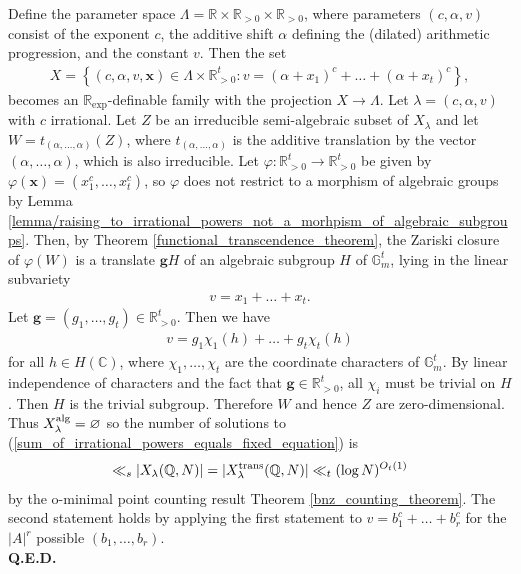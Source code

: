 \documentclass[9pt]{amsart}
\theoremstyle{my_theorem_style}
\numberwithin{definition}{section}
\renewenvironment{proof}{\noindent {\textbf{Proof.}}}{\\\textbf{Q.E.D.}}
\newcommand{\C}{\mathbb{C}}
\newcommand{\G}{\mathbb{G}}
\renewcommand{\phi}{\varphi}
\newcommand{\Q}{\mathbb{Q}}
\newcommand{\R}{\mathbb{R}}
\renewcommand{\vec}[1]{\bm{#1}}
\begin{document}
\begin{proof}
    Define the parameter space $\Lambda = \R \times \R_{>0} \times \R_{>0}$, where parameters $(c, \alpha, v)$ consist of the exponent $c$, the additive shift $\alpha$ defining the (dilated) arithmetic progression, and the constant $v$. Then the set
    \begin{align*}
        X = 
        \left\{
        (c, \alpha, v, \vec{x}) \in
        \Lambda \times \R_{>0}^t :
        v = (\alpha + x_1)^c + \dots + (\alpha + x_t)^c
        \right\},
    \end{align*}
    becomes an $\R_{\exp}$-definable family with the projection $X \to \Lambda$. Let $\lambda = (c, \alpha, v)$ with $c$ irrational. Let $Z$ be an irreducible semi-algebraic subset of $X_\lambda$ and let $W = t_{(\alpha, \dots, \alpha)}(Z)$, where $t_{(\alpha, \dots, \alpha)}$ is the additive translation by the vector $(\alpha, \dots, \alpha)$, which is also irreducible. Let $\phi : \R_{>0}^t \to \R_{>0}^t$ be given by $\phi(\vec{x}) = (x_1^c, \dots, x_t^c)$, so $\phi$ does not restrict to a morphism of algebraic groups by Lemma \ref{lemma/raising_to_irrational_powers_not_a_morhpism_of_algebraic_subgroups}. Then, by Theorem \ref{functional_transcendence_theorem}, the Zariski closure of $\phi(W)$ is a translate $\vec{g}H$ of an algebraic subgroup $H$ of $\G_m^t$, lying in the linear subvariety
    \begin{align*}
        v = x_1 + \dots + x_t.
    \end{align*}
    Let $\vec{g} = (g_1, \dots, g_t) \in \R_{>0}^t$. Then we have
    \begin{align*}
        v = g_1 \chi_1(h) + \dots + g_t \chi_t(h)
    \end{align*}
    for all $h \in H(\C)$, where $\chi_1, \dots, \chi_t$ are the coordinate characters of $\G_m^t$. By linear independence of characters and the fact that $\vec{g} \in \R_{>0}^t$, all $\chi_i$ must be trivial on $H$. Then $H$ is the trivial subgroup. Therefore $W$ and hence $Z$ are zero-dimensional. Thus $X_\lambda^{\rm alg} = \varnothing$ so the number of solutions to (\ref{sum_of_irrational_powers_equals_fixed_equation}) is
    \begin{align*}
        \ll_s |X_\lambda(\Q, N)| = |X_\lambda^{\rm trans}(\Q, N)| \ll_t
        (\log N)^{O_t(1)}
    \end{align*}
    by the o-minimal point counting result Theorem \ref{bnz_counting_theorem}. The second statement holds by applying the first statement to $v = b_1^c + \dots + b_r^c$ for the $|A|^r$ possible $(b_1, \dots, b_r)$.
\end{proof}
\end{document}
